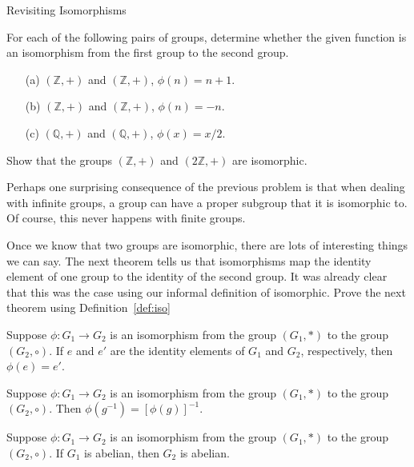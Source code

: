 \begin{section}{Revisiting Isomorphisms}
\begin{exercise}
For each of the following pairs of groups, determine whether the given function is an isomorphism from the first group to the second group.
\begin{enumerate}
\item[(a)] \((\mathbb{Z},+)\) and \((\mathbb{Z},+)\), \(\phi(n)=n+1\).
\item[(b)] \((\mathbb{Z},+)\) and \((\mathbb{Z},+)\), \(\phi(n)=-n\).
\item[(c)] \((\mathbb{Q},+)\) and \((\mathbb{Q},+)\), \(\phi(x)=x/2\).
\end{enumerate}

\end{exercise}

\begin{problem}
Show that the groups \((\mathbb{Z},+)\) and \((2\mathbb{Z},+)\) are isomorphic.
\end{problem}

Perhaps one surprising consequence of the previous problem is that when dealing with infinite groups, a group can have a proper subgroup that it is isomorphic to.  Of course, this never happens with finite groups.

Once we know that two groups are isomorphic, there are lots of interesting things we can say.  The next theorem tells us that isomorphisms map the identity element of one group to the identity of the second group.  It was already clear that this was the case using our informal definition of isomorphic.  Prove the next theorem using Definition~\ref{def:iso}

\begin{theorem}\label{thm:hom_id}
Suppose \(\phi:G_1\to G_2\) is an isomorphism from the group \((G_1,*)\) to the group \((G_2,\circ)\).  If \(e\) and \(e'\) are the identity elements of \(G_1\) and \(G_2\), respectively, then \(\phi(e)=e'\).
\end{theorem}

\begin{theorem}\label{thm:hom_inverse}
Suppose \(\phi:G_1\to G_2\) is an isomorphism from the group \((G_1,*)\) to the group \((G_2,\circ)\).   Then \(\phi(g^{-1})=[\phi(g)]^{-1}\).
\end{theorem}

\begin{theorem}
Suppose \(\phi:G_1\to G_2\) is an isomorphism from the group \((G_1,*)\) to the group \((G_2,\circ)\). If \(G_1\) is abelian, then \(G_2\) is abelian.
\end{theorem}


\end{section}
